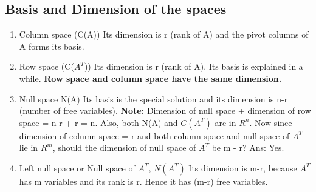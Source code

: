 \documentclass{article}
\begin{document}
\subsection{Basis and Dimension of the spaces}
\begin{enumerate}
    \item Column space (C(A))
\newline
Its dimension is r (rank of A) and the pivot columns of A forms its basis.
    \item Row space (C($A^T$))
\newline
Its dimension is r (rank of A). Its basis is explained in a while.
\newline
\textbf{Row space and column space have the same dimension.}
    \item Null space N(A)
\newline
Its basis is the special solution and its dimension is n-r (number of free variables).
\newline
\textbf{Note:} Dimension of null space + dimension of row space = n-r + r = n. Also, both N(A) and $C(A^T)$ are in $R^n$. Now since dimension of column space = r and both column space and null space of $A^T$ lie in $R^m$, should the dimension of  null space of $A^T$  be m - r? Ans: Yes.
    \item Left null space or Null space of $A^T$, $N(A^T)$
\newline Its dimension is m-r, because $A^T$ has m variables and its rank is r. Hence it has (m-r) free variables.


\end{enumerate}
\end{document}
